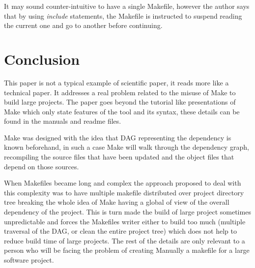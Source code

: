 It may sound counter-intuitive to have a single Makefile, however the author says that by using \textit{include}
statements, the Makefile is instructed to suspend reading the current one and go to another before continuing.

\section{Conclusion}

This paper is not a typical example of scientific paper, it reads more like a
technical paper. It addresses a real problem related to the misuse of Make to build large projects. The paper 
goes beyond the tutorial like presentations of Make which only state features of the tool and its syntax,
these details can be found in the manuals and
readme files.

Make was designed with the idea that DAG representing the dependency is known beforehand, in such a case 
Make will walk through the dependency graph, recompiling the source files that have been updated and the object 
files that depend on those sources. 

When Makefiles became long and complex the approach proposed to deal with this complexity was to have multiple
makefile distributed over project directory tree breaking the whole idea of Make having a global of view of the
overall dependency of the project. This is turn made the build of large project sometimes unpredictable and 
forces the Makefiles writer either to build too much (multiple traversal of the DAG, or clean the entire project tree)
which does not help to reduce build time of large projects. The rest of the details are only relevant to a person 
who will be facing the problem of creating Manually a makefile for a large software project.
